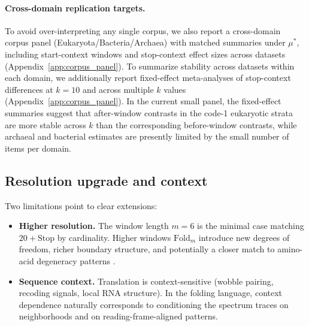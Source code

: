 \paragraph{Cross-domain replication targets.}
To avoid over-interpreting any single corpus, we also report a cross-domain corpus panel (Eukaryota/Bacteria/Archaea) with matched summaries under $\mu^\ast$, including start-context windows and stop-context effect sizes across datasets (Appendix~\ref{app:corpus_panel}).
To summarize stability across datasets within each domain, we additionally report fixed-effect meta-analyses of stop-context differences at $k=10$ and across multiple $k$ values (Appendix~\ref{app:corpus_panel}).
In the current small panel, the fixed-effect summaries suggest that after-window contrasts in the code-1 eukaryotic strata are more stable across $k$ than the corresponding before-window contrasts, while archaeal and bacterial estimates are presently limited by the small number of items per domain.

\subsection{Resolution upgrade and context}
\label{sec:resolution_upgrade}

Two limitations point to clear extensions:
\begin{itemize}
\item \textbf{Higher resolution.} The window length $m=6$ is the minimal case matching $20+\mathrm{Stop}$ by cardinality.
Higher windows $\mathrm{Fold}_m$ introduce new degrees of freedom, richer boundary structure, and potentially a closer match to amino-acid degeneracy patterns \cite{Ma2025RF}.
\item \textbf{Sequence context.} Translation is context-sensitive (wobble pairing, recoding signals, local RNA structure).
In the folding language, context dependence naturally corresponds to conditioning the spectrum traces on neighborhoods and on reading-frame-aligned patterns.
\end{itemize}

